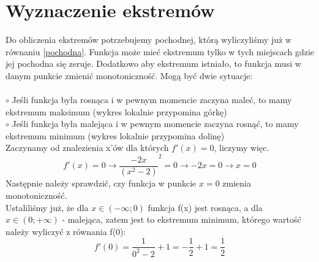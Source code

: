 \documentclass[10pt]{article}
\begin{document}
{{\section{Wyznaczenie ekstremów}
\noindent Do obliczenia ekstremów potrzebujemy pochodnej, którą wyliczyliśmy już w równaniu \ref{pochodna}. Funkcja może mieć ekstremum tylko w tych miejscach gdzie jej pochodna się zeruje. Dodatkowo aby ekstremum istniało, to funkcja musi w danym punkcie zmienić monotoniczność. Mogą być dwie sytuacje: \\ \\
$\circ$ Jeśli funkcja była rosnąca i w pewnym momencie zaczyna maleć, to mamy ekstremum maksimum (wykres lokalnie przypomina górkę) \\
$\circ$ Jeśli funkcja była malejąca i w pewnym momencie zaczyna rosnąć, to mamy ekstremum minimum (wykres lokalnie przypomina dolinę) \\
Zaczynamy od znalezienia x'ów dla których $f'(x) = 0$, liczymy więc.
{\large \begin{equation}
f'(x) = 0 \rightarrow \frac{-2x}{(x^2 - 2)}^2 = 0 \rightarrow -2x = 0 \rightarrow x = 0
\end{equation}}
Następnie należy sprawdzić, czy funkcja w punkcie $x=0$ zmienia monotoniczność. \\
Ustaliliśmy już, że dla $x \in (-\infty; 0)$ funkcja f(x) jest rosnąca, a dla $x \in (0;+\infty)$ - malejąca, zatem jest to ekstremum minimum, którego wartość należy wyliczyć z równania f(0):
{\large \begin{equation}
f'(0) = \frac{1}{0^2 -2}+1 = -\frac{1}{2} +1 = \frac{1}{2}
\end{equation}}
}}
\end{document}
